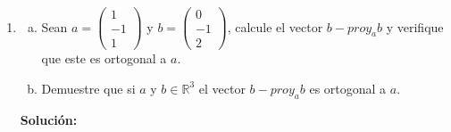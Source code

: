 \documentclass[12pt]{article}
\newenvironment{solucion}
{\begin{mdframed}[backgroundcolor=black!10]
		{\bf Solución:}\\
	}
	{
	\end{mdframed}
}
\newenvironment{preguntas}
{\begin{enumerate}\itemsep12pt
	}
	{
	\end{enumerate}
}
\newcommand{\ra}{\rightarrow}
\newcommand{\R}{\mathbb{R}}
\begin{document}
\begin{preguntas}
\begin{solucion}
		$$2x - 5y + z = D$$
		Reemplazando con el punto,
		$$8-10+1 = D \ra D = -1$$
		Luego, el plano buscado es
		$$\Pi: 2x - 5y + z = -1$$
\end{solucion}
\item 
\begin{enumerate}[a)]
\item Sean $a=\left(\begin{array}{r}
      1\\-1\\1
    \end{array}\right)$ y $b=\left(\begin{array}{r}
      0\\-1\\2
    \end{array}\right)$, calcule el vector\textbf{ $b-proy_a b$ }y verifique que este es ortogonal a $a$.
\item Demuestre que si $a$ y $b\in\R^3$ el vector $b-proy_a b$ es ortogonal a $a$.
\end{enumerate}
\begin{solucion}


\end{solucion}
\end{preguntas}
\end{document}
